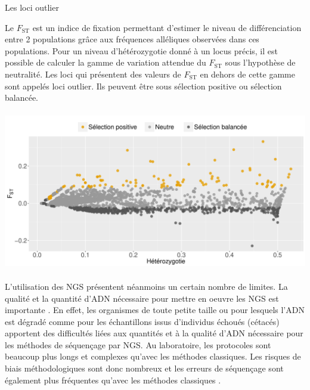 \documentclass[a4paper,12pt,twoside]{article}\usepackage[]{graphicx}\usepackage[]{color}
\begin{document}
\begin{enca}
	\caption{Les loci outlier}\label{outlier}
    Le $F_\text{ST}$ est un indice de fixation permettant d'estimer le niveau de différenciation entre 2 populations grâce aux fréquences alléliques observées dans ces populations. Pour un niveau d'hétérozygotie donné à un locus précis, il est possible de calculer la gamme de variation attendue du $F_\text{ST}$ sous l'hypothèse de neutralité. Les loci qui présentent des valeurs de $F_\text{ST}$ en dehors de cette gamme sont appelés loci outlier. Ils peuvent être sous sélection positive ou sélection balancée.


{\centering \includegraphics[width=14cm,height=7cm]{figure/lositan-1} 

}



		
\end{enca}

L'utilisation des NGS présentent néanmoins un certain nombre de limites. La qualité et la quantité d'ADN nécessaire pour mettre en oeuvre les NGS est importante \cite{davey2011genome}. En effet, les organismes de toute petite taille \citep{baily1992detection} ou pour lesquels l'ADN est dégradé comme pour les échantillons issus d'individus échoués (cétacés) \citep{taberlet2012towards, templeton2013dna} apportent des difficultés liées aux quantités et à la qualité d'ADN nécessaire pour les méthodes de séquençage par NGS. Au laboratoire, les protocoles sont beaucoup plus longs et complexes qu'avec les méthodes classiques. Les risques de biais méthodologiques sont donc nombreux \citep[voir par exemple][]{bonin2004aa, baird2008aa, peterson2012double, hohenlohe2012extensive, niu2010artificial, gomez2009systematic,haas2011chimeric} et les erreurs de séquençage sont également plus fréquentes qu'avec les méthodes classiques \citep{mastretta2015restriction, shendure2008next}.
\end{document}
